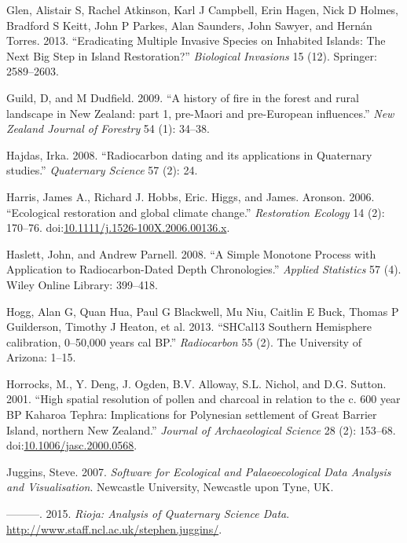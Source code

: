 \hypertarget{ref-glen2013eradicating}{}
Glen, Alistair S, Rachel Atkinson, Karl J Campbell, Erin Hagen, Nick D
Holmes, Bradford S Keitt, John P Parkes, Alan Saunders, John Sawyer, and
Hernán Torres. 2013. ``Eradicating Multiple Invasive Species on
Inhabited Islands: The Next Big Step in Island Restoration?''
\emph{Biological Invasions} 15 (12). Springer: 2589--2603.

\hypertarget{ref-guild2009history}{}
Guild, D, and M Dudfield. 2009. ``A history of fire in the forest and
rural landscape in New Zealand: part 1, pre-Maori and pre-European
influences.'' \emph{New Zealand Journal of Forestry} 54 (1): 34--38.

\hypertarget{ref-hajdas2008radiocarbon}{}
Hajdas, Irka. 2008. ``Radiocarbon dating and its applications in
Quaternary studies.'' \emph{Quaternary Science} 57 (2): 24.

\hypertarget{ref-Harris2006}{}
Harris, James A., Richard J. Hobbs, Eric. Higgs, and James. Aronson.
2006. ``Ecological restoration and global climate change.''
\emph{Restoration Ecology} 14 (2): 170--76.
doi:\href{https://doi.org/10.1111/j.1526-100X.2006.00136.x}{10.1111/j.1526-100X.2006.00136.x}.

\hypertarget{ref-haslett2008simple}{}
Haslett, John, and Andrew Parnell. 2008. ``A Simple Monotone Process
with Application to Radiocarbon-Dated Depth Chronologies.''
\emph{Applied Statistics} 57 (4). Wiley Online Library: 399--418.

\hypertarget{ref-hogg2013shcal13}{}
Hogg, Alan G, Quan Hua, Paul G Blackwell, Mu Niu, Caitlin E Buck, Thomas
P Guilderson, Timothy J Heaton, et al. 2013. ``SHCal13 Southern
Hemisphere calibration, 0--50,000 years cal BP.'' \emph{Radiocarbon} 55
(2). The University of Arizona: 1--15.

\hypertarget{ref-Horrocks2001}{}
Horrocks, M., Y. Deng, J. Ogden, B.V. Alloway, S.L. Nichol, and D.G.
Sutton. 2001. ``High spatial resolution of pollen and charcoal in
relation to the c. 600 year BP Kaharoa Tephra: Implications for
Polynesian settlement of Great Barrier Island, northern New Zealand.''
\emph{Journal of Archaeological Science} 28 (2): 153--68.
doi:\href{https://doi.org/10.1006/jasc.2000.0568}{10.1006/jasc.2000.0568}.

\hypertarget{ref-juggins2003software}{}
Juggins, Steve. 2007. \emph{Software for Ecological and Palaeoecological
Data Analysis and Visualisation}. Newcastle University, Newcastle upon
Tyne, UK.

\hypertarget{ref-rioja}{}
---------. 2015. \emph{Rioja: Analysis of Quaternary Science Data}.
\url{http://www.staff.ncl.ac.uk/stephen.juggins/}.

